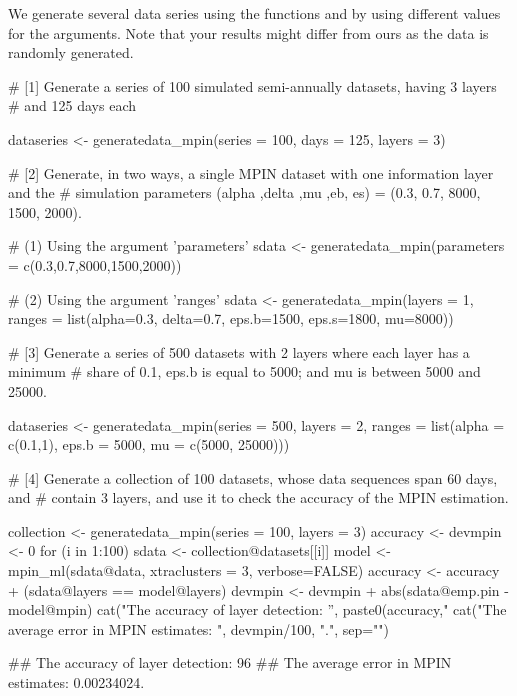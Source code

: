 We generate several data series using the functions  and  by using different values for the arguments. Note that your results might differ from ours as the data is randomly generated.

\begin{example}
# [1] Generate a series of 100 simulated semi-annually datasets, having 3 layers
# and 125 days each

dataseries <- generatedata_mpin(series = 100, days = 125, layers = 3)
\end{example}

\begin{example}
# [2] Generate, in two ways, a single MPIN dataset with one information layer and the
# simulation parameters (alpha ,delta ,mu ,eb, es) = (0.3, 0.7, 8000, 1500, 2000).

# (1) Using the argument 'parameters'
sdata <- generatedata_mpin(parameters = c(0.3,0.7,8000,1500,2000))

# (2) Using the argument 'ranges'
sdata <- generatedata_mpin(layers = 1,
ranges = list(alpha=0.3, delta=0.7, eps.b=1500, eps.s=1800, mu=8000))
\end{example}


\begin{example}
# [3] Generate a series of 500 datasets with 2 layers where each layer has a minimum
# share of 0.1, eps.b is equal to 5000; and mu is between 5000 and 25000.

dataseries <- generatedata_mpin(series = 500, layers = 2,
ranges = list(alpha = c(0.1,1), eps.b = 5000, mu = c(5000, 25000)))
\end{example} 

 
\begin{example}
# [4] Generate a collection of 100 datasets, whose data sequences span 60 days, and 
# contain 3 layers, and use it to check the accuracy of the MPIN estimation. 

collection <- generatedata_mpin(series = 100, layers = 3)
accuracy <- devmpin <- 0
for (i in 1:100) {
    sdata <- collection@datasets[[i]]
    model <- mpin_ml(sdata@data, xtraclusters = 3, verbose=FALSE)
    accuracy <- accuracy + (sdata@layers == model@layers)
    devmpin <- devmpin + abs(sdata@emp.pin - model@mpin)
}
cat("The accuracy of layer detection: ”, paste0(accuracy,"%
cat("The average error in MPIN estimates: ", devmpin/100, ".\n", sep="")

## The accuracy of layer detection: 96%
## The average error in MPIN estimates: 0.00234024.
\end{example} 


